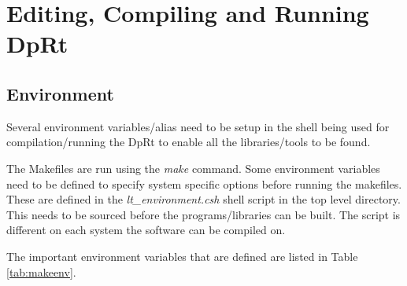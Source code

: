 \documentclass[10pt,a4paper]{article}
\begin{document}
\section{Editing, Compiling and Running DpRt}
\subsection{Environment}
Several environment variables/alias need to be setup in the shell being used for compilation/running the
DpRt to enable all the libraries/tools to be found.

The Makefiles are run using the {\em make} command. Some environment variables need to be defined to specify
system specific options before running the makefiles. These are defined in the {\em lt\_environment.csh}
shell script in the top level directory. This needs to be sourced before the programs/libraries can be built.
The script is different on each system the software can be compiled on.

The important environment variables that are defined are listed in Table \ref{tab:makeenv}.
\end{document}
